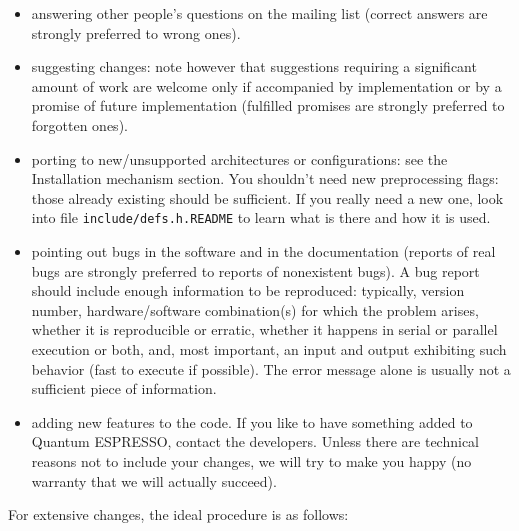 \documentclass[12pt,a4paper]{article}
\begin{document}
\begin{itemize}
\item answering other people's questions on the mailing list (correct
  answers are strongly preferred to wrong ones). 
\item  suggesting changes: note however that suggestions requiring a
  significant amount of work are welcome only if accompanied by
  implementation or by a promise of future implementation (fulfilled
  promises are strongly preferred to forgotten ones). 
\item porting to new/unsupported architectures or configurations: see
  the Installation mechanism section. You shouldn't need new
  preprocessing flags: those already existing should be sufficient. If
  you really need a new one, look into file
  \texttt{include/defs.h.README} to learn what is there and how it is
  used. 
\item pointing out bugs in the software and in the documentation
  (reports of real bugs are strongly preferred to reports of
  nonexistent bugs). A bug report should include enough information to
  be reproduced: typically, version number, hardware/software
  combination(s) for which the problem arises, whether it is
  reproducible or erratic, whether it happens in serial or parallel
  execution or both, and, most important, an input and output
  exhibiting such behavior (fast to execute if possible). The error
  message alone is usually not a sufficient piece of information. 
\item adding new features to the code. If you like to have something
  added to Quantum ESPRESSO, contact the developers. Unless there are
  technical reasons not to include your changes, we will try to make
  you happy (no warranty that we will actually succeed). 
\end{itemize}

For extensive changes, the ideal procedure is as follows:
\end{document}
